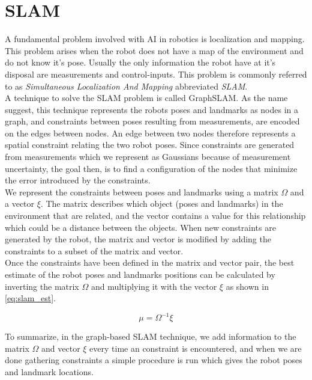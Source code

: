 
\section{SLAM}

A fundamental problem involved with AI in robotics is localization and mapping. This problem arises when the robot does not have a map of the environment and do not know it's pose. Usually the only information the robot have at it's disposal are measurements and control-inputs. This problem is commonly referred to as \textit{Simultaneous Localization And Mapping} abbreviated \textit{SLAM}.\\

A technique to solve the SLAM problem is called GraphSLAM. As the name suggest, this technique represents the robots poses and landmarks as nodes in a graph, and constraints between poses resulting from measurements, are encoded on the edges between nodes. An edge between two nodes therefore represents a spatial constraint relating the two robot poses. Since constraints are generated from measurements which we represent as Gaussians because of measurement uncertainty, the goal then, is to find a configuration of the nodes that minimize the error introduced by the constraints.\\

We represent the constraints between poses and landmarks using a matrix $\Omega$ and a vector $\xi$. The matrix describes which object (poses and landmarks) in the environment that are related, and the vector contains a value for this relationship which could be a distance between the objects. When new constraints are generated by the robot, the matrix and vector is modified by adding the constraints to a subset of the matrix and vector.\\

Once the constraints have been defined in the matrix and vector pair, the best estimate of the robot poses and landmarks positions can be calculated by inverting the matrix $\Omega$ and multiplying it with the vector $\xi$ as shown in \autoref{eq:slam_est}.

\begin{equation}
\label{eq:slam_est}
\mu = \Omega^{-1}\xi
\end{equation}

To summarize, in the graph-based SLAM technique, we add information to the matrix $\Omega$ and vector $\xi$ every time an constraint is encountered, and when we are done gathering constraints a simple procedure is run which gives the robot poses and landmark locations.

